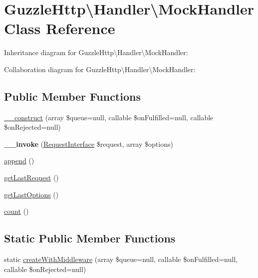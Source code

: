 \hypertarget{classGuzzleHttp_1_1Handler_1_1MockHandler}{}\section{Guzzle\+Http\textbackslash{}Handler\textbackslash{}Mock\+Handler Class Reference}
\label{classGuzzleHttp_1_1Handler_1_1MockHandler}


Inheritance diagram for Guzzle\+Http\textbackslash{}Handler\textbackslash{}Mock\+Handler\+:


Collaboration diagram for Guzzle\+Http\textbackslash{}Handler\textbackslash{}Mock\+Handler\+:
\subsection*{Public Member Functions}
\begin{DoxyCompactItemize}
\item 
\hyperlink{classGuzzleHttp_1_1Handler_1_1MockHandler_aec9499056c00b8e439cd506d204ccbfc}{\+\_\+\+\_\+construct} (array \$queue=null, callable \$on\+Fulfilled=null, callable \$on\+Rejected=null)
\item 
\mbox{\label{classGuzzleHttp_1_1Handler_1_1MockHandler_a2e723832e2d7e3de7f45d1e1e141164a}} 
{\bfseries \+\_\+\+\_\+invoke} (\hyperlink{interfacePsr_1_1Http_1_1Message_1_1RequestInterface}{Request\+Interface} \$request, array \$options)
\item 
\hyperlink{classGuzzleHttp_1_1Handler_1_1MockHandler_af590249e733932b38aba2a475f81736d}{append} ()
\item 
\hyperlink{classGuzzleHttp_1_1Handler_1_1MockHandler_a55df209dc13fc934df2d4ada1fc59028}{get\+Last\+Request} ()
\item 
\hyperlink{classGuzzleHttp_1_1Handler_1_1MockHandler_ac59d2313d26737b1b932a0c376d5c9cc}{get\+Last\+Options} ()
\item 
\hyperlink{classGuzzleHttp_1_1Handler_1_1MockHandler_a8c1b39b146048819e507b8529f4e84c9}{count} ()
\end{DoxyCompactItemize}
\subsection*{Static Public Member Functions}
\begin{DoxyCompactItemize}
\item 
static \hyperlink{classGuzzleHttp_1_1Handler_1_1MockHandler_a1178d28f3c427638cd7157f753fd2e36}{create\+With\+Middleware} (array \$queue=null, callable \$on\+Fulfilled=null, callable \$on\+Rejected=null)
\end{DoxyCompactItemize}


